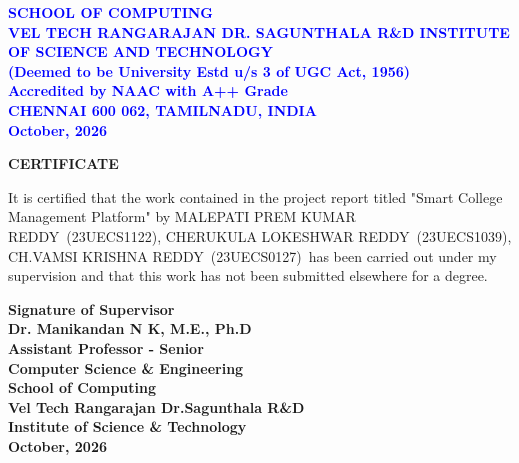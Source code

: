\documentclass[10pt]{report}
\newcommand{\ProjectTitle}{Smart College Management Platform}
\newcommand{\StudentOne}{MALEPATI PREM KUMAR REDDY}
\newcommand{\RegisterOne}{23UECS1122}
\newcommand{\StudentTwo}{CHERUKULA LOKESHWAR REDDY}
\newcommand{\RegisterTwo}{23UECS1039}
\newcommand{\StudentThree}{CH.VAMSI KRISHNA REDDY}
\newcommand{\RegisterThree}{23UECS0127}
\newcommand{\GuideName}{Dr. Manikandan N K}
\newcommand{\GuideDegree}{M.E., Ph.D}
\newcommand{\GuideDesignation}{Assistant Professor - Senior}
\newcommand{\SubmissionDate}{October, 2026}
\newcommand{\TeamNames}{\StudentOne\ (\RegisterOne), \StudentTwo\ (\RegisterTwo), \StudentThree\ (\RegisterThree)}
\begin{document}
\begin{center}
\large{\textbf{\textcolor{blue}{SCHOOL OF COMPUTING}}}\\
\vspace{0.5cm}
\Large{\textbf{\textcolor{blue}{VEL TECH RANGARAJAN DR. SAGUNTHALA R\&D INSTITUTE OF
SCIENCE AND TECHNOLOGY\\
\vspace{0.5cm}
(Deemed to be University Estd u/s 3 of UGC Act,
1956)}}}\\\Large{\textbf{\textcolor{blue}{Accredited by NAAC with A++ Grade}}}\\
\large{\textbf{\textcolor{blue}{CHENNAI 600 062, TAMILNADU, INDIA}}}
\large{\textbf{\textcolor{blue}{\\\SubmissionDate}}}\\
\end{center}

\newpage
{}
\begin{center}
{\Huge \textbf{CERTIFICATE}}\\[1cm]
\end{center}
\linespread{1.5}
\large{It is certified that the work contained in the project report titled "\ProjectTitle" by \TeamNames\ has been carried out under my supervision and that this work has not
been submitted elsewhere for a degree.}
\vspace{1.5cm}
\begin{flushright}
\textbf{Signature of Supervisor\\\GuideName, \GuideDegree\\\GuideDesignation\\Computer Science \&
Engineering\\School of Computing\\Vel Tech Rangarajan Dr.Sagunthala R\&D\\Institute of Science \&
Technology\\\SubmissionDate}\\[2.0cm]


\end{flushright}
\end{document}
